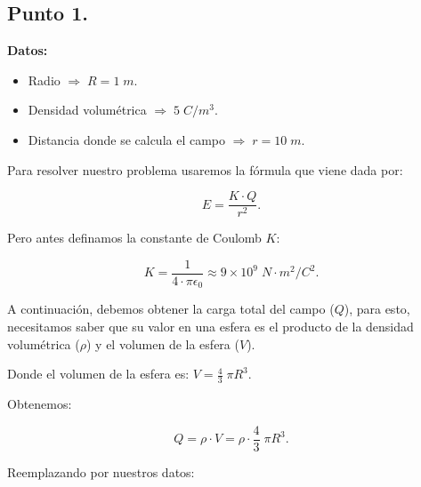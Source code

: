 \documentclass[a4paper,12pt]{article} %
\begin{document}
\subsection*{Punto 1.}

\vspace{\baselineskip}

\textbf{Datos:}

\begin{itemize}
    \item Radio \(\Rightarrow \; R = 1 \;m\).
    \item Densidad volumétrica \(\Rightarrow \; 5 \; C/m^3\).
    \item Distancia donde se calcula el campo \(\Rightarrow \; r = 10 \; m\).
\end{itemize}

\vspace{\baselineskip}

\begin{justify}
    Para resolver nuestro problema usaremos la fórmula que viene dada por:
\end{justify}


\[E = \frac{K \cdot Q}{r^2}. \]

\begin{justify}
    Pero antes definamos la constante de Coulomb \(K\):
\end{justify}

\[K = \frac{1}{4 \cdot \pi \epsilon_0 } \approx 9 \times 10^9 \; N \cdot m^2 / C^2.\]

\vspace{\baselineskip}

\begin{justify}
    A continuación, debemos obtener la carga total del campo (\(Q\)), para esto, necesitamos saber que su valor en una esfera es
    el producto de la densidad volumétrica (\(\rho\)) y el volumen de la esfera (\(V\)). 
\end{justify}

\begin{justify}
    Donde el volumen de la esfera es: \(V = \frac{4}{3} \; \pi R^3\).
\end{justify}

\begin{justify}
    Obtenemos:
\end{justify}

\[Q = \rho \cdot V = \rho \cdot \frac{4}{3} \; \pi R^3.\]

\begin{justify}
    Reemplazando por nuestros datos:
\end{justify}
\end{document}
